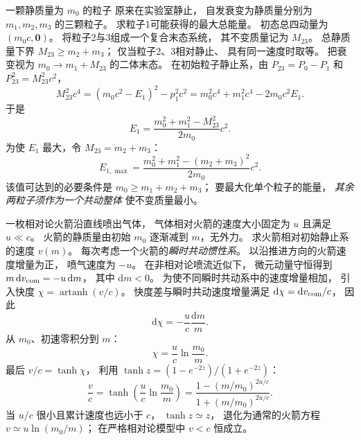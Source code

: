 一颗静质量为 $m_0$ 的粒子
原来在实验室静止，
自发衰变为静质量分别为
$m_1,m_2,m_3$ 的三颗粒子。
求粒子1可能获得的最大总能量。
\exsolution
初态总四动量为
$(m_0c,\bm0)$。
将粒子2与3组成一个复合末态系统，
其不变质量记为 $M_{23}$。
总静质量下界
$M_{23}\ge m_2+m_3$；
仅当粒子2、3相对静止、
具有同一速度时取等。
把衰变视为
$m_0\to m_1+M_{23}$ 的二体末态。
在初始粒子静止系，由
$P_{23}=P_0-P_1$ 和
$P_{23}^2=M_{23}^2c^2$，
\[
M_{23}^2c^4
=(m_0c^2-E_1)^2-p_1^2c^2
=m_0^2c^4+m_1^2c^4-2m_0c^2E_1.
\]
于是
\[
E_1=
\frac{m_0^2+m_1^2-M_{23}^2}{2m_0}c^2.
\]
为使 $E_1$ 最大，令 $M_{23}=m_2+m_3$：
\[
\boxed{E_{1,\max}=
\frac{m_0^2+m_1^2-(m_2+m_3)^2}{2m_0}c^2}.
\]
\excheck 该值可达到的必要条件是
$m_0\ge m_1+m_2+m_3$；
要最大化单个粒子的能量，
\emph{其余两粒子须作为一个共动整体}
使不变质量最小。

一枚相对论火箭沿直线喷出气体，
气体相对火箭的速度大小固定为
$u$ 且满足 $u\ll c$。
火箭的静质量由初始 $m_0$
逐渐减到 $m$，无外力。
求火箭相对初始静止系的速度 $v(m)$。
\exsolution
每次考虑一个火箭的\emph{瞬时共动惯性系}。
以沿推进方向的火箭速度增量为正，
喷气速度为 $-u$。
在非相对论喷流近似下，
微元动量守恒得到
$m\,\mathrm dv_{\rm com}=-u\,\mathrm dm$，
其中 $\mathrm dm<0$。
为使不同瞬时共动系中的速度增量相加，
引入快度
$\chi=\operatorname{artanh}(v/c)$。
快度差与瞬时共动速度增量满足
$\mathrm d\chi=\mathrm dv_{\rm com}/c$，
因此
\[
\mathrm d\chi=-\frac{u}{c}\frac{\mathrm dm}{m}.
\]
从 $m_0$、初速零积分到 $m$：
\[
\chi=\frac uc\ln\frac{m_0}{m}.
\]
最后 $v/c=\tanh\chi$，
利用
$\tanh z=(1-e^{-2z})/(1+e^{-2z})$：
\[
\boxed{\frac vc=
\tanh\!\left(\frac uc\ln\frac{m_0}{m}\right)
=\frac{1-(m/m_0)^{2u/c}}
{1+(m/m_0)^{2u/c}}}.
\]
\excheck 当 $u/c$ 很小且累计速度也远小于 $c$，
$\tanh z\simeq z$，
退化为通常的火箭方程
$v\simeq u\ln(m_0/m)$；
在严格相对论模型中 $v<c$ 恒成立。
